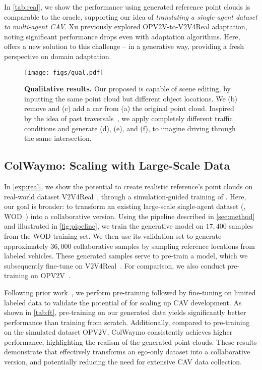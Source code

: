 In \cref{tab:real}, we show the performance using generated reference point clouds is comparable to the oracle, supporting our idea of \emph{translating a single-agent dataset to multi-agent CAV}. Xu \etal previously explored OPV2V-to-V2V4Real adaptation, noting significant performance drops even with adaptation algorithms. Here, \ours offers a new solution to this challenge -- in a generative way, providing a fresh perspective on domain adaptation.
\begin{figure*}[ht]
\centering
\texttt{[image: figs/qual.pdf]}
\vspace{-3mm}
\caption{
\label{fig:qual}
\small \textbf{Qualitative results.} Our proposed \ours is capable of scene editing, by inputting the same point cloud but different object locations. We (b) remove and (c) add a car from (a) the original point cloud. Inspired by the idea of past traversals~\citep{you2022hindsight}, we apply completely different traffic conditions and generate (d), (e), and (f), to imagine driving through the same intersection.
}
\vspace{-5mm}
\end{figure*}


\subsection{ColWaymo: Scaling with Large-Scale Data}
\label{exp:colwaymo}

In \cref{exp:real}, we show the potential to create realistic reference's point clouds on real-world dataset V2V4Real~\citep{xu2023v2v4real}, through a simulation-guided training of \ours. Here, our goal is broader: to transform an existing large-scale single-agent dataset (\eg, WOD~\citep{sun2020waymo}) into a collaborative version. Using the pipeline described in \cref{sec:method} and illustrated in \cref{fig:pipeline}, we train the generative model on $17,400$ samples from the WOD training set. We then use its validation set to generate approximately $36,000$ collaborative samples by sampling reference locations from labeled vehicles. These generated samples serve to pre-train a model, which we subsequently fine-tune on V2V4Real~\citep{xu2023v2v4real}. For comparison, we also conduct pre-training on OPV2V~\citep{xu2022opv2v}.


Following prior work~\citep{pan2023pre,xie2020pointcontrast,yin2022proposalcontrast,boulch2023also}, we perform pre-training followed by fine-tuning on limited labeled data to validate the potential of \ours for scaling up CAV development. As shown in \cref{tab:ft}, pre-training on our generated data yields significantly better performance than training from scratch. Additionally, compared to pre-training on the simulated dataset OPV2V, ColWaymo consistently achieves higher performance, highlighting the realism of the generated point clouds. These results demonstrate that \ours effectively transforms an ego-only dataset into a collaborative version, and potentially reducing the need for extensive CAV data collection.

